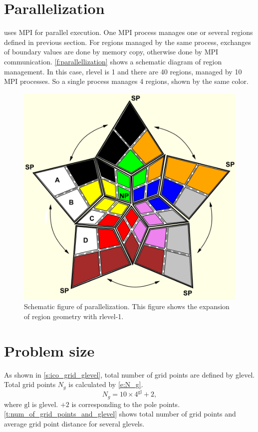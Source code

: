 \section{Parallelization}


\NICAM uses MPI for parallel execution.
%
One MPI process manages one or several regions defined in previous
section.
%
For regions managed by the same process, exchanges of boundary values
are done by memory copy, otherwise done by MPI communication.
%
\autoref{f:parallellization} shows a schematic diagram of region
management.
%
In this case, rlevel is 1 and there are 40 regions, managed by 10 MPI
processes.
%
So a single process manages 4 regions, shown by the same color.

\begin{figure}[htb]
\centering
\includegraphics[scale=.7]{figs/Tomita2-10-0.png}
\caption{Schematic figure of parallelization. This figure shows the expansion of region geometry
with rlevel-1.}
\label{f:parallellization}
\end{figure}

\section{Problem size}

As shown in \autoref{s:ico_grid_glevel}, total number of grid points
are defined by glevel.
%
Total grid points $N_g$ is calculated by \autoref{e:N_g}.
%
\begin{equation}
 N_g = 10 \times 4^\text{gl} + 2, \label{e:N_g}
\end{equation}
%
where $\text{gl}$ is glevel. $+ 2$ is corresponding to the pole points.
%
\autoref{t:num_of_grid_points_and_glevel} shows total number of grid points and average
grid point distance for several
glevels.


